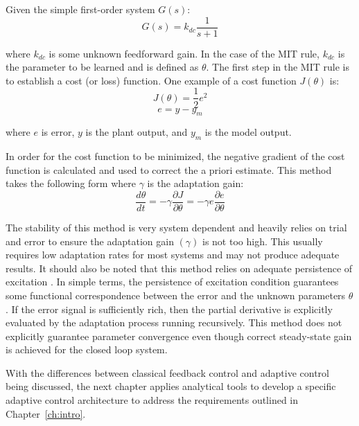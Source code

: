 Given the simple first-order system $G(s)$:
\begin{equation}
G(s) = k_{dc}\frac{1}{s+1}
\end{equation}

where $k_{dc}$ is some unknown feedforward gain.  In the case of the MIT rule, $k_{dc}$ is the parameter to be learned and is defined as $\theta$.  The first step in the MIT rule is to establish a cost (or loss) function.  One example of a cost function $J(\theta)$ is:
\begin{equation}
J(\theta) = \frac{1}{2}e^2
\end{equation}
\begin{equation}
e=y-y_m
\end{equation}

where $e$ is error, $y$ is the plant output, and $y_m$ is the model output.

In order for the cost function to be minimized, the negative gradient of the cost function is calculated and used to correct the a priori estimate.  This method takes the following form where $\gamma$ is the adaptation gain:
\begin{equation}
\frac{d\theta}{dt}=-\gamma \frac{\partial{J}}{\partial{\theta}} =-\gamma e\frac{\partial{e}}{\partial{\theta}}
\end{equation}

The stability of this method is very system dependent and heavily relies on trial and error to ensure the adaptation gain $(\gamma)$ is not too high.  This usually requires low adaptation rates for most systems and may not produce adequate results.  It should also be noted that this method relies on adequate persistence of excitation \cite{aastrom2013adaptive}.  In simple terms, the persistence of excitation condition guarantees some functional correspondence between the error and the unknown parameters $\theta$. If the error signal is sufficiently rich, then the partial derivative is explicitly evaluated by the adaptation process running recursively.  This method does not explicitly guarantee parameter convergence even though correct steady-state gain is achieved for the closed loop system.

With the differences between classical feedback control and adaptive control being discussed, the next chapter applies analytical tools to develop a specific adaptive control architecture to address the requirements outlined in Chapter~\ref{ch:intro}.




